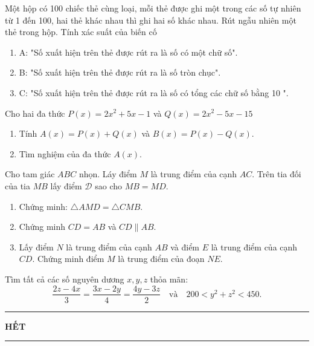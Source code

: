 \begin{bt}[1,5 điểm]
	Một hộp có 100 chiếc thẻ cùng loại, mỗi thẻ được ghi một trong các số tự nhiên từ 1 đến 100, hai thẻ khác nhau thì ghi hai số khác nhau. Rút ngẫu nhiên một thẻ trong hộp. Tính xác suất của biến cố
	\begin{enumerate}
		\item A: "Số xuất hiện trên thẻ được rút ra là số có một chữ số".
		\item B: "Số xuất hiện trên thẻ được rút ra là số tròn chục".
		\item C: "Số xuất hiện trên thẻ được rút ra là số có tổng các chữ số bằng 10 ".
	\end{enumerate}
	\loigiai{}
\end{bt}
\begin{bt}Cho hai đa thức $P(x)=2x^2+5x-1$ và $Q(x)=2x^2-5x-15$
\begin{enumerate}
	\item Tính $A(x)=P(x)+Q(x)$ và $B(x)=P(x)-Q(x)$.
	\item Tìm nghiệm của đa thức $A(x)$.
\end{enumerate}
\loigiai{}
\end{bt}
\begin{bt}[3,0 điểm]
	Cho tam giác $ABC$ nhọn. Láy điểm $M$ là trung điểm của cạnh $AC$. Trên tia đối của tia $MB$ lấy điểm $\mathscr{D}$ sao cho $MB=MD$.
	\begin{enumerate}
		\item Chứng minh: $\triangle AMD=\triangle CMB$.
		\item Chứng minh $CD=AB$ và $CD \parallel AB$.
		\item Lấy điểm $N$ là trung điểm của cạnh $AB$ và điểm $E$ là trung điểm của cạnh $CD$. Chứng minh điểm $M$ là trung điểm của đoạn $NE$.
	\end{enumerate}
	\loigiai{}
\end{bt}

\begin{bt}[0,5 điểm]
	Tìm tất cả các số nguyên dương $x, y, z$ thỏa mãn:
	\[
	\dfrac{2 z-4 x}{3}=\dfrac{3 x-2 y}{4}=\dfrac{4 y-3 z}{2} \quad \text{và}\quad 200 < y^2+z^2 < 450.
	\]
	\loigiai{}
\end{bt}

\fileend
\begin{center}
	\rule[4pt]{2cm}{1pt}\large \textbf{HẾT}\rule[4pt]{2cm}{1pt}
\end{center}
